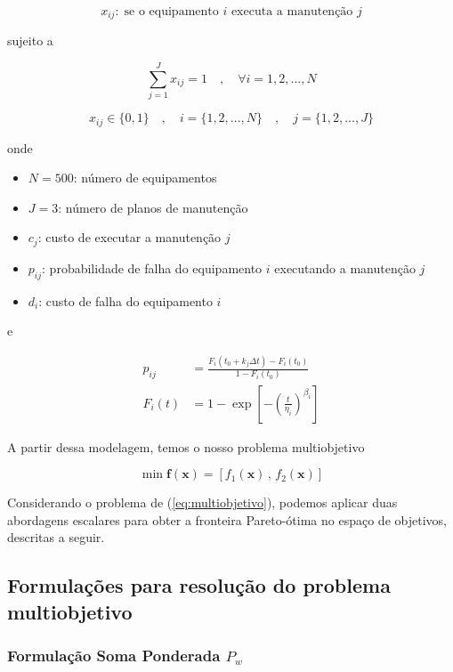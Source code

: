 \documentclass[conference]{IEEEtran}
\newcommand{\un}[1]{\;\text{#1}}
\begin{document}
\[  x_{ij}: \un{se o equipamento $i$ executa a manutenção $j$}  \]


\noindent sujeito a

\[ \sum_{j=1}^{J} x_{ij} = 1 \quad , \quad \forall i = {1, 2, ..., N} \]

\[ x_{ij} \in \{0,1\} \quad , \quad i = \{1, 2, ..., N\}  \quad , \quad j = \{1, 2, ..., J\} \]

\noindent onde

\begin{itemize}
	\item $N = 500$: número de equipamentos
	\item $J = 3$: número de planos de manutenção
	\item $c_j$: custo de executar a manutenção $j$
	\item $p_{ij}$: probabilidade de falha do equipamento $i$ executando a manutenção $j$
	\item $d_{i}$: custo de falha do equipamento $i$
\end{itemize}

\noindent e 

\begin{align}
p_{ij} &= \frac{F_i \left(t_0 + k_j \Delta t \right) - F_i\left(t_0\right) }{1 - F_i\left(t_0\right)} \\
F_i(t) &= 1 - \exp \left[ - \left( \frac{t}{\eta_i} \right)^{\beta_i} \right]
\end{align}

A partir dessa modelagem, temos o nosso problema multiobjetivo 

\begin{equation} \label{eq:multiobjetivo}
	\min \mathbf{f}\left( \mathbf{x} \right) = \left[ f_1\left( \mathbf{x} \right) \, , \, f_2\left( \mathbf{x} \right) \right]
\end{equation}

Considerando o problema de (\ref{eq:multiobjetivo}), podemos aplicar duas abordagens escalares 
para obter a fronteira Pareto-ótima no espaço de objetivos, descritas a seguir.

\subsection{Formulações para resolução do problema multiobjetivo}

\subsubsection{Formulação Soma Ponderada $P_{w}$}
\end{document}
